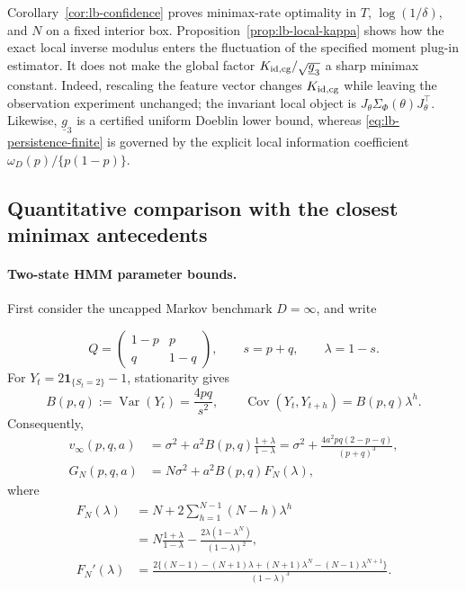 \begin{remark}
\label{rem:lb-scope}
Corollary~\ref{cor:lb-confidence} proves minimax-rate optimality in
\(T\), \(\log(1/\delta)\), and \(N\) on a fixed interior box.
Proposition~\ref{prop:lb-local-kappa} shows how the exact local inverse
modulus enters the fluctuation of the specified moment plug-in estimator.
It does not make the global factor
\(K_{\rm id,cg}/\sqrt{\underline g_3}\) a sharp minimax constant.
Indeed, rescaling the feature vector changes \(K_{\rm id,cg}\) while leaving
the observation experiment unchanged; the invariant local object is
\(J_\theta\Sigma_\Phi(\theta)J_\theta^\top\).  Likewise,
\(\underline g_3\) is a certified uniform Doeblin lower bound, whereas
\eqref{eq:lb-persistence-finite} is governed by the explicit local
information coefficient
\(\omega_D(p)/\{p(1-p)\}\).
\end{remark}

\subsection{Quantitative comparison with the closest minimax antecedents}
\label{subsec:lb-exact-literature-map}

\paragraph{Two-state HMM parameter bounds.}
First consider the uncapped Markov benchmark \(D=\infty\), and write

\[
 Q=\begin{pmatrix}1-p&p\\q&1-q\end{pmatrix},\qquad
 s=p+q,\qquad \lambda=1-s.
\]
For \(Y_t=2\mathbf 1_{\{S_t=2\}}-1\), stationarity gives
\[
 B(p,q):=\operatorname{Var}(Y_t)=\frac{4pq}{s^2},\qquad
 \operatorname{Cov}(Y_t,Y_{t+h})=B(p,q)\lambda^h.
\]
Consequently,
\begin{align}
 v_\infty(p,q,a)
 &=\sigma^2+a^2B(p,q)\frac{1+\lambda}{1-\lambda}
 =\sigma^2+\frac{4a^2pq(2-p-q)}{(p+q)^3},
 \label{eq:agn-map-vinfty}\\
 G_N(p,q,a)
 &=N\sigma^2+a^2B(p,q)F_N(\lambda),
 \label{eq:agn-map-GN}
\end{align}
where
\begin{align}
 F_N(\lambda)
 &=N+2\sum_{h=1}^{N-1}(N-h)\lambda^h
 \nonumber\\
 &=N\frac{1+\lambda}{1-\lambda}
 -\frac{2\lambda(1-\lambda^N)}{(1-\lambda)^2},
 \label{eq:agn-map-FN}\\
 F_N'(\lambda)
 &=\frac{2\{(N-1)-(N+1)\lambda
 +(N+1)\lambda^N-(N-1)\lambda^{N+1}\}}
 {(1-\lambda)^3}.
 \label{eq:agn-map-FNprime}
\end{align}


